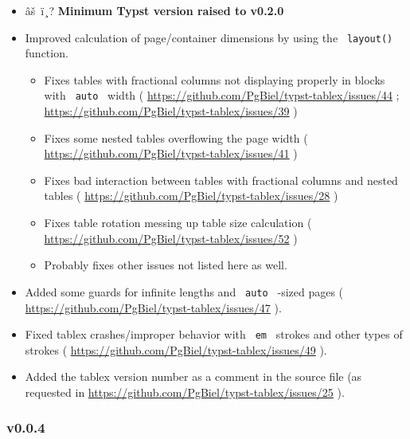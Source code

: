 \begin{itemize}
\tightlist
\item
  âš~ï¸? \textbf{Minimum Typst version raised to v0.2.0}
\item
  Improved calculation of page/container dimensions by using the
  \texttt{\ layout()\ } function.

  \begin{itemize}
  \tightlist
  \item
    Fixes tables with fractional columns not displaying properly in
    blocks with \texttt{\ auto\ } width (
    \url{https://github.com/PgBiel/typst-tablex/issues/44} ;
    \url{https://github.com/PgBiel/typst-tablex/issues/39} )
  \item
    Fixes some nested tables overflowing the page width (
    \url{https://github.com/PgBiel/typst-tablex/issues/41} )
  \item
    Fixes bad interaction between tables with fractional columns and
    nested tables (
    \url{https://github.com/PgBiel/typst-tablex/issues/28} )
  \item
    Fixes table rotation messing up table size calculation (
    \url{https://github.com/PgBiel/typst-tablex/issues/52} )
  \item
    Probably fixes other issues not listed here as well.
  \end{itemize}
\item
  Added some guards for infinite lengths and \texttt{\ auto\ } -sized
  pages ( \url{https://github.com/PgBiel/typst-tablex/issues/47} ).
\item
  Fixed tablex crashes/improper behavior with \texttt{\ em\ } strokes
  and other types of strokes (
  \url{https://github.com/PgBiel/typst-tablex/issues/49} ).
\item
  Added the tablex version number as a comment in the source file (as
  requested in \url{https://github.com/PgBiel/typst-tablex/issues/25} ).
\end{itemize}

\subsubsection{v0.0.4}\label{v0.0.4}

